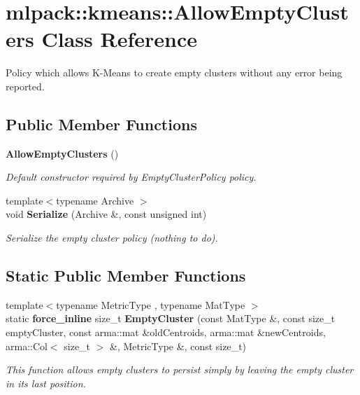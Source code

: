 \section{mlpack\+:\+:kmeans\+:\+:Allow\+Empty\+Clusters Class Reference}
\label{classmlpack_1_1kmeans_1_1AllowEmptyClusters}


Policy which allows K-\/\+Means to create empty clusters without any error being reported.  


\subsection*{Public Member Functions}
\begin{DoxyCompactItemize}
\item 
{\bf Allow\+Empty\+Clusters} ()
\begin{DoxyCompactList}\small\item\em Default constructor required by Empty\+Cluster\+Policy policy. \end{DoxyCompactList}\item 
{\footnotesize template$<$typename Archive $>$ }\\void {\bf Serialize} (Archive \&, const unsigned int)
\begin{DoxyCompactList}\small\item\em Serialize the empty cluster policy (nothing to do). \end{DoxyCompactList}\end{DoxyCompactItemize}
\subsection*{Static Public Member Functions}
\begin{DoxyCompactItemize}
\item 
{\footnotesize template$<$typename Metric\+Type , typename Mat\+Type $>$ }\\static {\bf force\+\_\+inline} size\+\_\+t {\bf Empty\+Cluster} (const Mat\+Type \&, const size\+\_\+t empty\+Cluster, const arma\+::mat \&old\+Centroids, arma\+::mat \&new\+Centroids, arma\+::\+Col$<$ size\+\_\+t $>$ \&, Metric\+Type \&, const size\+\_\+t)
\begin{DoxyCompactList}\small\item\em This function allows empty clusters to persist simply by leaving the empty cluster in its last position. \end{DoxyCompactList}\end{DoxyCompactItemize}


